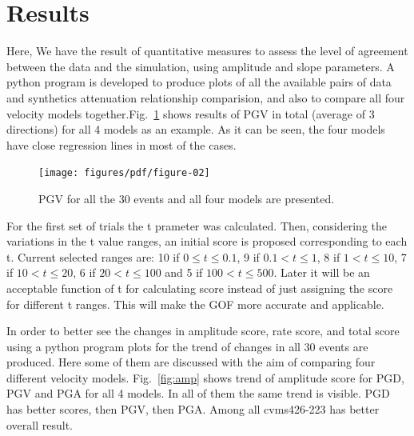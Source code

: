 
\section{Results}

Here, We have the result of quantitative measures to assess the level of agreement between the data and the simulation, using amplitude and slope parameters. A python program is developed to produce plots of all the available pairs of data and synthetics attenuation relationship comparision, and also to compare all four velocity models together.Fig.~\ref{fig:pgv} shows results of PGV in total (average of 3 directions) for all 4 models as an example. As it can be seen, the four models have close regression lines in most of the cases.

\begin{figure}
    \centering
    \texttt{[image: figures/pdf/figure-02]}
    \caption{PGV for all the 30 events and all four models are presented.}
    \label{fig:pgv}
\end{figure}

For the first set of trials the t prameter was calculated. Then, considering the variations in the t value ranges, an initial score is proposed corresponding to each t. Current selected ranges are: 10 if $0 \leq t\leq 0.1$, 9 if $0.1 < t\leq 1$, 8 if  $1 < t\leq 10$, 7 if  $10 < t\leq 20$, 6 if  $20 < t\leq 100$ and 5 if  $100 < t\leq 500$. Later it will be an acceptable function of t for calculating score instead of just assigning the score for different t ranges. This will make the GOF more accurate and applicable.

In order to better see the changes in amplitude score, rate score, and total score using a python program plots for the trend of changes in all 30 events are produced. Here some of them are discussed with the aim of comparing four different velocity models. Fig.~\ref{fig:amp} shows trend of amplitude score for PGD, PGV and PGA for all 4 models. In all of them the same trend is visible. PGD has better scores, then PGV, then PGA. Among all cvms426-223 has better overall result.

